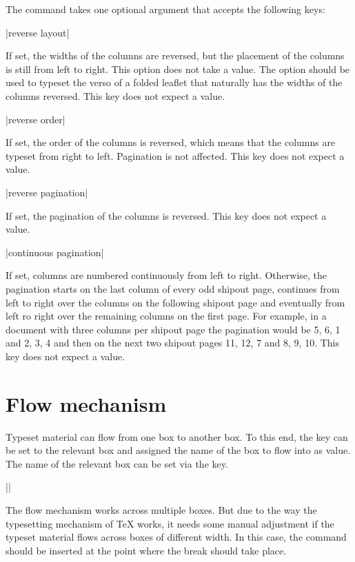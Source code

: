 \documentclass[a4paper]{article}
\begin{document}
The command takes one optional argument that accepts the following keys:

\begin{macrodef}
|reverse layout|
\end{macrodef}
If set, the widths of the columns are reversed, but the placement of the columns is still from left to right. This option does not take a value. The option should be used to typeset the verso of a folded leaflet that naturally has the widths of the columns reversed. This key does not expect a value.

\begin{macrodef}
|reverse order|
\end{macrodef}
If set, the order of the columns is reversed, which means that the columns are typeset from right to left. Pagination is not affected. This key does not expect a value.

\begin{macrodef}
|reverse pagination|
\end{macrodef}
If set, the pagination of the columns is reversed. This key does not expect a value.

\begin{macrodef}
|continuous pagination|
\end{macrodef}
If set, columns are numbered continuously from left to right. Otherwise, the pagination starts on the last column of every odd shipout page, continues from left to right over the columns on the following shipout page and eventually from left ro right over the remaining columns on the first page. For example, in a document with three columns per shipout page the pagination would be 5, 6, 1 and 2, 3, 4 and then on the next two shipout pages 11, 12, 7 and 8, 9, 10. This key does not expect a value.

\section{Flow mechanism}\label{sec:flow}

Typeset material can flow from one box to another box. To this end, the key  can be set to the relevant box and assigned the name of the box to flow into as value. The name of the relevant box can be set via the  key.

\begin{macrodef}
|\leporelloboxbreak|
\end{macrodef}
The flow mechanism works across multiple boxes. But due to the way the typesetting mechanism of TeX works, it needs some manual adjustment if the typeset material flows across boxes of different width. In this case, the command \macro{\leporelloboxbreak} should be inserted at the point where the break should take place.
\end{document}
